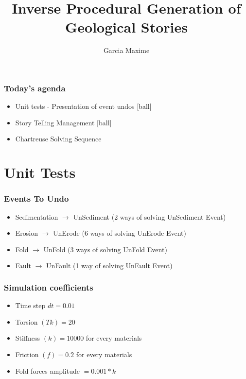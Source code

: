 \documentclass{beamer}
\title[Monthly Meeting: June]{Inverse Procedural Generation of Geological Stories}
\author{Garcia Maxime}
\begin{document}
	
    \begin{frame}[label=(intro)]
	\titlepage
    \end{frame}
	
	
	\begin{frame}
	\frametitle{Today's agenda}
	\begin{itemize}
	[ball]
	\item Unit tests - Presentation of event undos
	[ball]
	\item Story Telling Management
	[ball]
	\item Chartreuse Solving Sequence

	\end{itemize}
	\end{frame}
	
	
	\section{Unit Tests}
	
	\begin{frame}
	\frametitle{Events To Undo}
    \begin{itemize}
    \item Sedimentation $\rightarrow$  UnSediment (2 ways of solving UnSediment Event)
    \item Erosion $\rightarrow$  UnErode (6 ways of solving UnErode Event)
    \item Fold $\rightarrow$  UnFold (3 ways of solving UnFold Event)
    \item Fault $\rightarrow$  UnFault (1 way of solving UnFault Event)
    \end{itemize}
    \end{frame}
    
    \begin{frame}
	\frametitle{Simulation coefficients}
    \begin{itemize}
    \item Time step $dt = 0.01$
	\item Torsion $(Tk) = 20$
	\item Stiffness $(k) = 10000$ for every materials 
	\item Friction $(f) = 0.2$ for every materials 
	\item Fold forces amplitude $= 0.001*k$
    \end{itemize}
    \end{frame}
    
\end{document}
